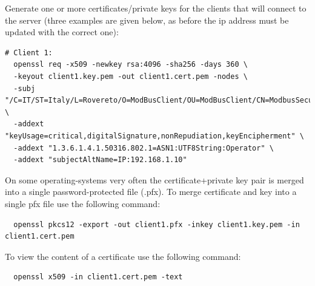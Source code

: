 Generate one or more certificates/private keys for the clients that 
will connect to the server (three examples are given below, 
as before the ip address must be updated with the correct one):

\begin{verbatim}
# Client 1:
  openssl req -x509 -newkey rsa:4096 -sha256 -days 360 \
  -keyout client1.key.pem -out client1.cert.pem -nodes \
  -subj "/C=IT/ST=Italy/L=Rovereto/O=ModBusClient/OU=ModBusClient/CN=ModbusSecurityClient" \
  -addext "keyUsage=critical,digitalSignature,nonRepudiation,keyEncipherment" \
  -addext "1.3.6.1.4.1.50316.802.1=ASN1:UTF8String:Operator" \
  -addext "subjectAltName=IP:192.168.1.10"
\end{verbatim}

On some operating-systems very often the certificate+private key pair is merged into a 
single password-protected file (.pfx).
To merge certificate and key into a single pfx file use the following command:

\begin{verbatim}
  openssl pkcs12 -export -out client1.pfx -inkey client1.key.pem -in client1.cert.pem
\end{verbatim}

To view the content of a certificate use the following command:

\begin{verbatim}
  openssl x509 -in client1.cert.pem -text
\end{verbatim}
